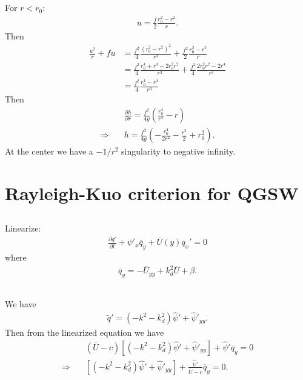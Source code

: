 \documentclass[11pt,letterpaper]{book}
\theoremstyle{definition}
\newcommand{\pe}{\partial}
\newcommand{\thus}{\Rightarrow \quad }
\begin{document}
\subsection{}\label{prob:jan_2015_1_5}
For $r<r_0$:
\begin{align*}
u = \frac{f}{2}\frac{r_0^2-r^2}{r}.
\end{align*}
Then
\begin{align*}
    \frac{u^2}{r}+fu &= \frac{f^2}{4}\frac{(r_0^2-r^2)^2}{r^3}+\frac{f^2}{2}\frac{r_0^2-r^2}{r}\\
    &= \frac{f^2}{4}\frac{r_0^4+r^4-2r_0^2r^2}{r^3}+\frac{f^2}{4}\frac{2r_0^2r^2-2r^4}{r^3}\\
    &= \frac{f^2}{4}\frac{r_0^4-r^4}{r^3}
\end{align*}
Then
\begin{align*}
    &\frac{\pe h}{\pe r} = \frac{f^2}{4g}\left(\frac{r_0^4}{r^3}-r\right)\\
    \thus & h = \frac{f^2}{4g}\left(-\frac{r_0^4}{2 r^2}-\frac{r^2}{2}+r_0^2\right).
\end{align*}
At the center we have a $-1/r^2$ singularity to negative infinity. 


\section{Rayleigh-Kuo criterion for QGSW}
\subsection{}
Linearize:
\begin{align*}
    \frac{\pe q'}{\pe t}+\psi'_x\overline{q}_y+\overline{U}(y)q_x' = 0
\end{align*}
where 
\begin{align*}
    \overline{q}_y = -\overline{U}_{yy}+k_d^2\overline{U}+\beta.
\end{align*}

\subsection{}
We have
\begin{align*}
    \tilde{q}' = (-k^2-k_d^2)\hat{\psi}'+\hat{\psi}'_{yy}.
\end{align*}
Then from the linearized equation we have
\begin{align*}
    &(\overline{U}-c)[(-k^2-k_d^2)\hat{\psi}'+\hat{\psi}'_{yy}] + \hat{\psi}' \overline{q}_y = 0\\
    \thus& [(-k^2-k_d^2)\hat{\psi}'+\hat{\psi}'_{yy}] + \frac{\hat{\psi}'}{\overline{U}-c}\overline{q}_y = 0.
\end{align*}
\end{document}
